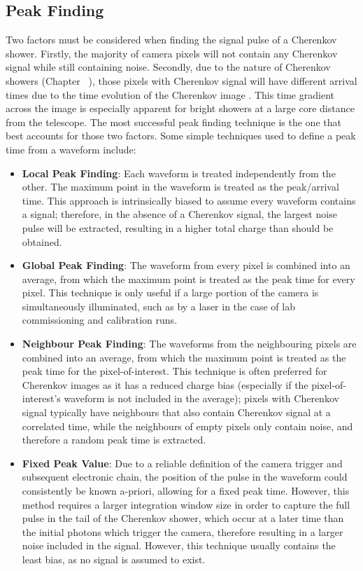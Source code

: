 \subsection{Peak Finding} \label{peakfinding}

Two factors must be considered when finding the signal pulse of a Cherenkov shower. Firstly, the majority of camera pixels will not contain any Cherenkov signal while still containing noise. Secondly, due to the nature of Cherenkov showers (Chapter~ ), those pixels with Cherenkov signal will have different arrival times due to the time evolution of the Cherenkov image . This time gradient across the image is especially apparent for bright showers at a large core distance from the telescope. The most successful peak finding technique is the one that best accounts for those two factors. Some simple techniques used to define a peak time from a waveform include:
\begin{itemize}
	\item \textbf{Local Peak Finding}: Each waveform is treated independently from the other. The maximum point in the waveform is treated as the peak/arrival time. This approach is intrinsically biased to assume every waveform contains a signal; therefore, in the absence of a Cherenkov signal, the largest noise pulse will be extracted, resulting in a higher total charge than should be obtained.
	\item \textbf{Global Peak Finding}: The waveform from every pixel is combined into an average, from which the maximum point is treated as the peak time for every pixel. This technique is only useful if a large portion of the camera is simultaneously illuminated, such as by a laser in the case of lab commissioning and calibration runs.
	\item \textbf{Neighbour Peak Finding}: The waveforms from the neighbouring pixels are combined into an average, from which the maximum point is treated as the peak time for the pixel-of-interest. This technique is often preferred for Cherenkov images as it has a reduced charge bias (especially if the pixel-of-interest's waveform is not included in the average); pixels with Cherenkov signal typically have neighbours that also contain Cherenkov signal at a correlated time, while the neighbours of empty pixels only contain noise, and therefore a random peak time is extracted.
	\item \textbf{Fixed Peak Value}: Due to a reliable definition of the camera trigger and subsequent electronic chain, the position of the pulse in the waveform could consistently be known a-priori, allowing for a fixed peak time. However, this method requires a larger integration window size in order to capture the full pulse in the tail of the Cherenkov shower, which occur at a later time than the initial photons which trigger the camera, therefore resulting in a larger noise included in the signal. However, this technique usually contains the least bias, as no signal is assumed to exist.
\end{itemize}

